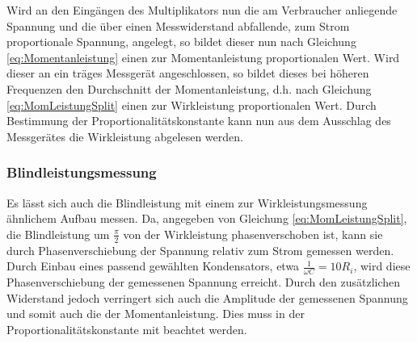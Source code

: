 Wird an den Eingängen des Multiplikators nun die am Verbraucher anliegende Spannung und die über einen Messwiderstand abfallende, zum Strom proportionale Spannung, angelegt, so bildet dieser nun nach Gleichung \eqref{eq:Momentanleistung} einen zur Momentanleistung proportionalen Wert. Wird dieser an ein träges Messgerät angeschlossen, so bildet dieses bei höheren Frequenzen den Durchschnitt der Momentanleistung, d.h. nach Gleichung \eqref{eq:MomLeistungSplit} einen zur Wirkleistung proportionalen Wert. Durch Bestimmung der Proportionalitätskonstante kann nun aus dem Ausschlag des Messgerätes die Wirkleistung abgelesen werden.

\subsubsection{Blindleistungsmessung}
\label{sec:MessungBlindleistung}
Es lässt sich auch die Blindleistung mit einem zur Wirkleistungsmessung ähnlichem Aufbau messen. Da, angegeben von Gleichung \eqref{eq:MomLeistungSplit}, die Blindleistung um $\frac{\pi}{2}$ von der Wirkleistung phasenverschoben ist, kann sie durch Phasenverschiebung der Spannung relativ zum Strom gemessen werden.
Durch Einbau eines passend gewählten Kondensators, etwa $\frac{1}{\omega C} = 10R_i$, wird diese Phasenverschiebung der gemessenen Spannung erreicht. Durch den zusätzlichen Widerstand jedoch verringert sich auch die Amplitude der gemessenen Spannung und somit auch die der Momentanleistung. Dies muss in der Proportionalitätskonstante mit beachtet werden.